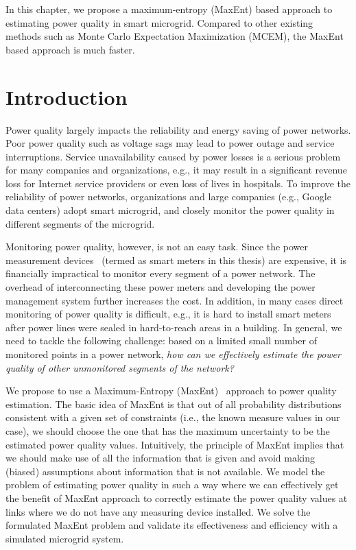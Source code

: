\label{chap:PQEstimation}
\small
In this chapter, we propose a maximum-entropy (MaxEnt) based approach to estimating power quality in smart microgrid. Compared to other existing methods such as Monte Carlo Expectation Maximization (MCEM), the MaxEnt based approach is much faster.

\normalsize
\section{Introduction}
Power quality largely impacts the reliability and energy saving of power networks. Poor power quality such as voltage sags may lead to power outage and service interruptions. Service unavailability caused by power losses is a serious problem for many companies and organizations, e.g., it may result in a significant revenue loss for Internet service providers or even loss of lives in hospitals. To improve the reliability of power networks, organizations and large companies (e.g., Google data centers) adopt smart microgrid, and closely monitor the power quality in different segments of the microgrid.

Monitoring power quality, however, is not an easy task. Since the power measurement devices~\cite{fluke_meter}\cite{schneider_meter} (termed as smart meters in this thesis) are expensive, it is financially impractical to monitor every segment of a power network. The overhead of interconnecting these power meters and developing the power management system further increases the cost. In addition, in many cases direct monitoring of power quality is difficult, e.g., it is hard to install smart meters after power lines were sealed in hard-to-reach areas in a building. In general, we need to tackle the following challenge: based on a limited small number of monitored points in a power network, \textit{how can we effectively estimate the power quality of other unmonitored segments of the network?} 

We propose to use a Maximum-Entropy (MaxEnt)~\cite{maxent} approach to power quality estimation. The basic idea of MaxEnt is that out of all probability distributions consistent with a given set of constraints (i.e., the known measure values in our case), we should choose the one that has the maximum uncertainty to be the estimated power quality values. Intuitively, the principle of MaxEnt implies that we should make use of all the information that is given and avoid making (biased) assumptions about information that is not available. We model the problem of estimating power quality in such a way where we can effectively get the benefit of MaxEnt approach to correctly estimate the power quality values at links where we do not have any measuring device installed. We solve the formulated MaxEnt problem and validate its effectiveness and efficiency with a simulated microgrid system.

